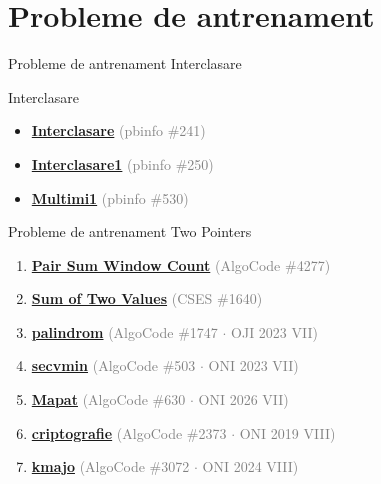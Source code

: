 \documentclass{beamer}
\begin{document}
\section{Probleme de antrenament}

\begin{frame}{Probleme de antrenament \textemdash{} Interclasare}
  \begin{block}{Interclasare}
    \begin{itemize}\footnotesize\itemsep0pt
      \item \href{https://www.pbinfo.ro/probleme/241/interclasare}{\textbf{Interclasare}} \textcolor{gray}{(pbinfo \#241)}
      \item \href{https://www.pbinfo.ro/probleme/250/interclasare1}{\textbf{Interclasare1}} \textcolor{gray}{(pbinfo \#250)}
      \item \href{https://www.pbinfo.ro/probleme/530/multimi1}{\textbf{Multimi1}} \textcolor{gray}{(pbinfo \#530)}
    \end{itemize}
  \end{block}
\end{frame}

\begin{frame}{Probleme de antrenament \textemdash{} Two Pointers}
  \begin{enumerate}\footnotesize\itemsep2pt
    \item \href{https://code.algolymp.com/problems/4277}{\textbf{Pair Sum Window Count}}
          \textcolor{gray}{(AlgoCode \#4277)}
    \item \href{https://cses.fi/problemset/task/1640}{\textbf{Sum of Two Values}}
          \textcolor{gray}{(CSES \#1640)}
    \item \href{https://code.algolymp.com/problems/1747}{\textbf{palindrom}}
          \textcolor{gray}{(AlgoCode \#1747 $\cdot$ OJI 2023 VII)}
    \item \href{https://code.algolymp.com/problems/503}{\textbf{secvmin}}
          \textcolor{gray}{(AlgoCode \#503 $\cdot$ ONI 2023 VII)}
    \item \href{https://code.algolymp.com/problems/630}{\textbf{Mapat}}
          \textcolor{gray}{(AlgoCode \#630 $\cdot$ ONI 2026 VII)}
    \item \href{https://code.algolymp.com/problems/2373}{\textbf{criptografie}}
          \textcolor{gray}{(AlgoCode \#2373 $\cdot$ ONI 2019 VIII)}
    \item \href{https://code.algolymp.com/problems/3072}{\textbf{kmajo}}
          \textcolor{gray}{(AlgoCode \#3072 $\cdot$ ONI 2024 VIII)}
  \end{enumerate}
\end{frame}
\end{document}
